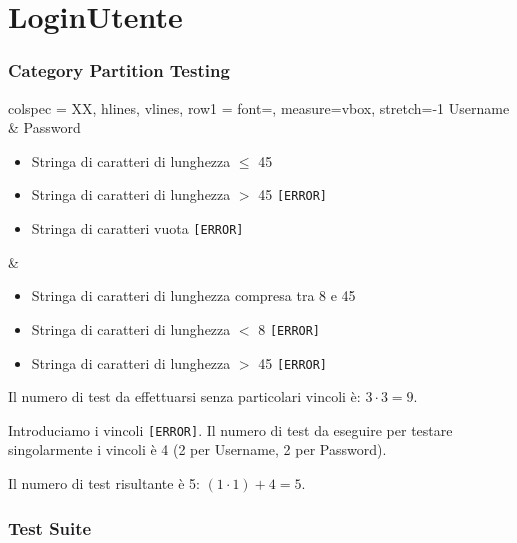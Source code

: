 \section{LoginUtente}

\subsubsection*{Category Partition Testing}

\begin{table}[!hbp]
	\centering
	\footnotesize
	\begin{tblr}{
		colspec = XX,
		hlines, vlines,
		row{1} = {font=\bfseries},
		measure=vbox, stretch=-1
		}
		Username & Password \\
		\begin{itemize}[leftmargin=*]
			\item Stringa di caratteri di lunghezza $\leq$ 45
			\item Stringa di caratteri di lunghezza $>$ 45 \texttt{[ERROR]}
			\item Stringa di caratteri vuota \texttt{[ERROR]}
		\end{itemize} &
		\begin{itemize}[leftmargin=*]
			\item Stringa di caratteri di lunghezza compresa tra 8 e 45
			\item Stringa di caratteri di lunghezza $<$ 8 \texttt{[ERROR]}
			\item Stringa di caratteri di lunghezza $>$ 45 \texttt{[ERROR]}
		\end{itemize}
	\end{tblr}
\end{table}

\noindent Il numero di test da effettuarsi senza particolari vincoli è: $3 \cdot 3 = 9$.

\noindent Introduciamo i vincoli \texttt{[ERROR]}. Il numero di test da eseguire per testare singolarmente i vincoli è 4 (2 per Username, 2 per Password).

\noindent Il numero di test risultante è 5: $(1 \cdot 1) + 4 = 5$.

\subsubsection*{Test Suite}

